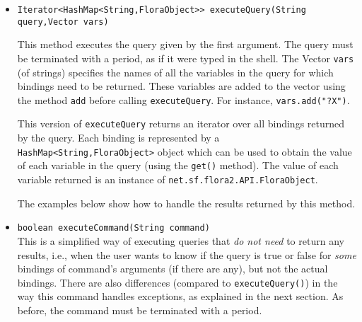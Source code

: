\begin{itemize}
\item
\begin{verbatim}
Iterator<HashMap<String,FloraObject>> executeQuery(String query,Vector vars)
\end{verbatim}
  This method executes the \FLSYSTEM query given by the first argument.
The query must be terminated with a period, as if it were typed
in the \FLSYSTEM shell.
 The Vector {\tt vars} (of strings) specifies the names of all the variables
  in the query for which bindings need to be returned. These variables are
  added to the vector using the method {\tt add} before calling
  {\tt executeQuery}. For instance, {\tt vars.add("?X")}.  
  
  This version of {\tt executeQuery} returns an iterator over all bindings
  returned by the \FLSYSTEM query.  Each binding is represented by a {\tt
    HashMap<String,FloraObject>} 
  object which can be used to obtain the value of each variable in the
  query (using the {\tt get()} method). The value of each variable returned
  is an instance of {\tt net.sf.flora2.API.FloraObject}.

  The examples below show how to handle the results returned by this method.

\item \texttt{boolean executeCommand(String command)} \\
  This is a simplified way of executing \FLSYSTEM queries that \emph{do not need}
  to return any results, i.e., when the user wants to know if the query is
  true or false for \emph{some} bindings of command's arguments (if there
  are any), but not the actual bindings.
  There are also differences (compared to \texttt{executeQuery()})
  in the way this command handles exceptions, as
  explained in the next section.
  As before, the command must be terminated with a period.


\end{itemize}
